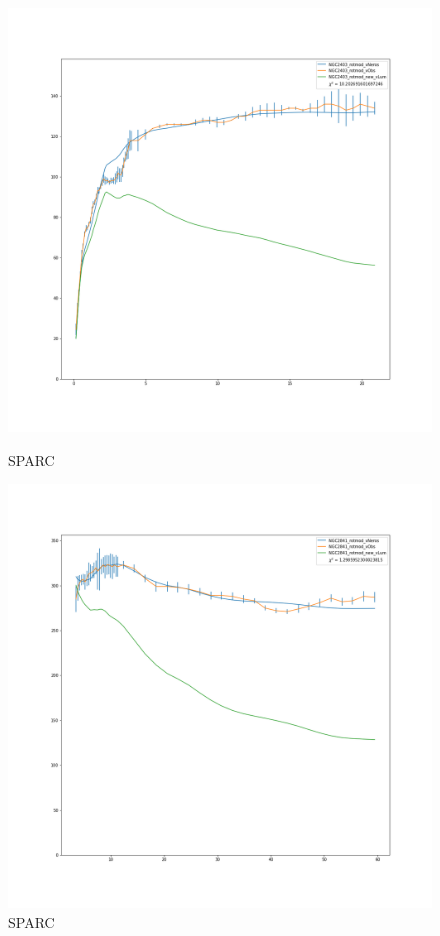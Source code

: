 \documentclass[reprint,%
 amsmath,amssymb,
 aps,
]{revtex4-1}
\begin{document}
  
\begin{figure} 
\centering
\begin{minipage}{0.5\textwidth}
  \includegraphics[width=.8\linewidth]{figures/NGC2403_rotmod_XueSofue.png}
\caption{ SPARC\cite{2016Lelli}}
\label{fig:2841}
\end{minipage}
\begin{minipage}{0.5\textwidth}
\includegraphics[width=0.43\linewidth]{figures/NGC2841_rotmod_XueSofue.png}
\caption{ SPARC\cite{2016Lelli}}
\label{fig:2915}
\end{minipage}
\end{figure}
 
\end{document}
